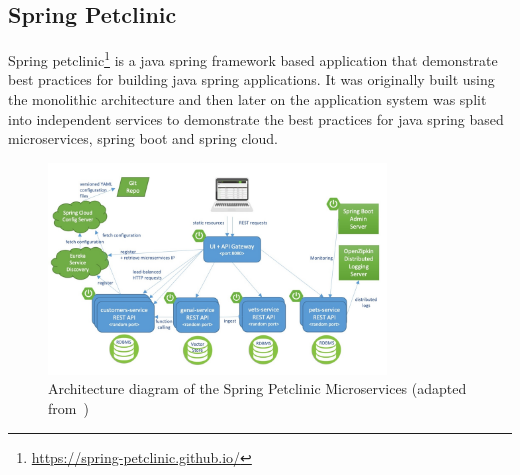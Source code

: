 \subsection{Spring Petclinic}\label{java_spring_petclinic}
Spring petclinic\footnote{\url{https://spring-petclinic.github.io/}} is a java spring framework based application that demonstrate best practices for building java spring applications. It was originally built using the monolithic architecture and then later on the application system was split into independent services to demonstrate the best practices for java spring based microservices, spring boot and spring cloud. 

\begin{figure}[H]
    \centering
    \includegraphics[width=0.8\textwidth]{figures/spring_petclinic_ms_architecture.jpg}
    \caption[Architecture diagram of the Spring Petclinic Microservices]{Architecture diagram of the Spring Petclinic Microservices (adapted from~\citep{SpringPetClinicMicroservices})}
	\label{fig_spring_petClinic_microservices}
\end{figure}

